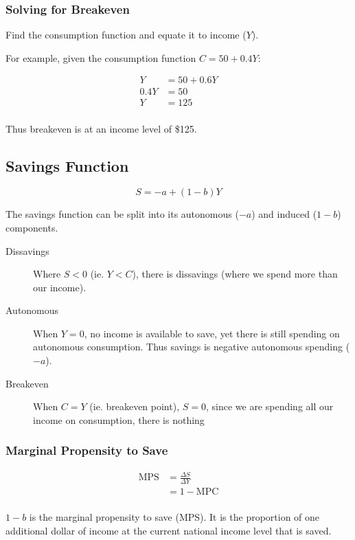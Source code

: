 \documentclass[a4paper,11pt]{article}
\begin{document}
\subsubsection{Solving for Breakeven}

Find the consumption function and equate it to income ($Y$).

For example, given the consumption function $C = 50 + 0.4Y$:

$$
\begin{aligned}
Y & = 50 + 0.6Y \\
0.4Y & = 50 \\
Y & = 125 \\
\end{aligned}
$$

Thus breakeven is at an income level of \$125.


\subsection{Savings Function}

$$
S = -a + (1 - b)Y
$$

The savings function can be split into its autonomous ($-a$) and induced
($1 - b$) components.

\begin{description}
\item [Dissavings] Where $S < 0$ (ie. $Y < C$), there is dissavings (where we
	spend more than our income).
\item [Autonomous] When $Y = 0$, no income is available to save, yet there is
	still spending on autonomous consumption. Thus savings is negative autonomous
	spending ($-a$).
\item [Breakeven] When $C = Y$ (ie. breakeven point), $S = 0$, since we are
	spending all our income on consumption, there is nothing
\end{description}


\subsubsection{Marginal Propensity to Save}

$$
\begin{aligned}
\mbox{MPS} & = \frac{\Delta S}{\Delta Y} \\
& = 1 - \mbox{MPC} \\
\end{aligned}
$$

$1 - b$ is the marginal propensity to save (MPS). It is the proportion of one
additional dollar of income at the current national income level that is saved.
\end{document}
